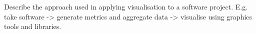 
Describe the approach used in applying visualisation to a software project. E.g. take software -> generate metrics and aggregate data -> visualise using graphics tools and libraries. 


